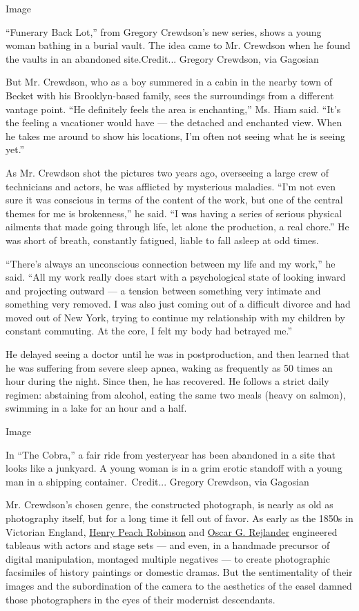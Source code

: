 Image

``Funerary Back Lot,'' from Gregory Crewdson's new series, shows a young
woman bathing in a burial vault. The idea came to Mr. Crewdson when he
found the vaults in an abandoned site.Credit... Gregory Crewdson, via
Gagosian

But Mr. Crewdson, who as a boy summered in a cabin in the nearby town of
Becket with his Brooklyn-based family, sees the surroundings from a
different vantage point. ``He definitely feels the area is enchanting,''
Ms. Hiam said. ``It's the feeling a vacationer would have --- the
detached and enchanted view. When he takes me around to show his
locations, I'm often not seeing what he is seeing yet.''

As Mr. Crewdson shot the pictures two years ago, overseeing a large crew
of technicians and actors, he was afflicted by mysterious maladies.
``I'm not even sure it was conscious in terms of the content of the
work, but one of the central themes for me is brokenness,'' he said. ``I
was having a series of serious physical ailments that made going through
life, let alone the production, a real chore.'' He was short of breath,
constantly fatigued, liable to fall asleep at odd times.

``There's always an unconscious connection between my life and my
work,'' he said. ``All my work really does start with a psychological
state of looking inward and projecting outward --- a tension between
something very intimate and something very removed. I was also just
coming out of a difficult divorce and had moved out of New York, trying
to continue my relationship with my children by constant commuting. At
the core, I felt my body had betrayed me.''

He delayed seeing a doctor until he was in postproduction, and then
learned that he was suffering from severe sleep apnea, waking as
frequently as 50 times an hour during the night. Since then, he has
recovered. He follows a strict daily regimen: abstaining from alcohol,
eating the same two meals (heavy on salmon), swimming in a lake for an
hour and a half.

Image

In ``The Cobra,'' a fair ride from yesteryear has been abandoned in a
site that looks like a junkyard. A young woman is in a grim erotic
standoff with a young man in a shipping container.~Credit... Gregory
Crewdson, via Gagosian

Mr. Crewdson's chosen genre, the constructed photograph, is nearly as
old as photography itself, but for a long time it fell out of favor. As
early as the 1850s in Victorian England,
\href{https://www.getty.edu/art/collection/artists/1936/henry-peach-robinson-british-1830-1901/}{Henry
Peach Robinson} and
\href{https://www.getty.edu/art/collection/artists/1650/oscar-gustave-rejlander-british-born-sweden-1813-1875/}{Oscar
G. Rejlander} engineered tableaus with actors and stage sets --- and
even, in a handmade precursor of digital manipulation, montaged multiple
negatives --- to create photographic facsimiles of history paintings or
domestic dramas. But the sentimentality of their images and the
subordination of the camera to the aesthetics of the easel damned those
photographers in the eyes of their modernist descendants.

